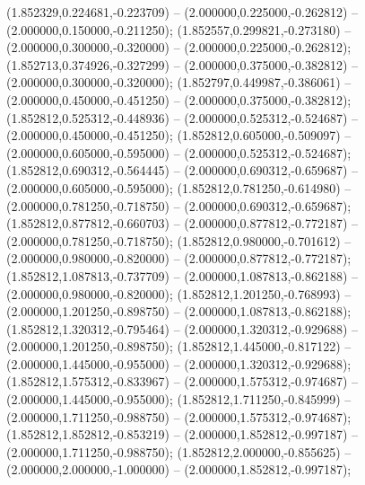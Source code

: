  (1.852329,0.224681,-0.223709) -- (2.000000,0.225000,-0.262812) -- (2.000000,0.150000,-0.211250);
 (1.852557,0.299821,-0.273180) -- (2.000000,0.300000,-0.320000) -- (2.000000,0.225000,-0.262812);
 (1.852713,0.374926,-0.327299) -- (2.000000,0.375000,-0.382812) -- (2.000000,0.300000,-0.320000);
 (1.852797,0.449987,-0.386061) -- (2.000000,0.450000,-0.451250) -- (2.000000,0.375000,-0.382812);
 (1.852812,0.525312,-0.448936) -- (2.000000,0.525312,-0.524687) -- (2.000000,0.450000,-0.451250);
 (1.852812,0.605000,-0.509097) -- (2.000000,0.605000,-0.595000) -- (2.000000,0.525312,-0.524687);
 (1.852812,0.690312,-0.564445) -- (2.000000,0.690312,-0.659687) -- (2.000000,0.605000,-0.595000);
 (1.852812,0.781250,-0.614980) -- (2.000000,0.781250,-0.718750) -- (2.000000,0.690312,-0.659687);
 (1.852812,0.877812,-0.660703) -- (2.000000,0.877812,-0.772187) -- (2.000000,0.781250,-0.718750);
 (1.852812,0.980000,-0.701612) -- (2.000000,0.980000,-0.820000) -- (2.000000,0.877812,-0.772187);
 (1.852812,1.087813,-0.737709) -- (2.000000,1.087813,-0.862188) -- (2.000000,0.980000,-0.820000);
 (1.852812,1.201250,-0.768993) -- (2.000000,1.201250,-0.898750) -- (2.000000,1.087813,-0.862188);
 (1.852812,1.320312,-0.795464) -- (2.000000,1.320312,-0.929688) -- (2.000000,1.201250,-0.898750);
 (1.852812,1.445000,-0.817122) -- (2.000000,1.445000,-0.955000) -- (2.000000,1.320312,-0.929688);
 (1.852812,1.575312,-0.833967) -- (2.000000,1.575312,-0.974687) -- (2.000000,1.445000,-0.955000);
 (1.852812,1.711250,-0.845999) -- (2.000000,1.711250,-0.988750) -- (2.000000,1.575312,-0.974687);
 (1.852812,1.852812,-0.853219) -- (2.000000,1.852812,-0.997187) -- (2.000000,1.711250,-0.988750);
 (1.852812,2.000000,-0.855625) -- (2.000000,2.000000,-1.000000) -- (2.000000,1.852812,-0.997187);

